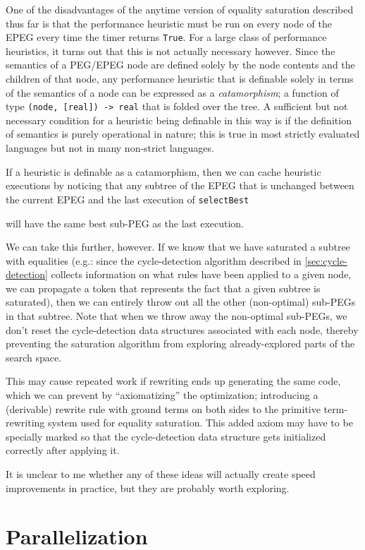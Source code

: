 \documentclass[11pt]{report}
\newcommand{\haskell}[1]{\texttt{#1}}
\newcommand{\sfixme}[0]{%
  \begin{minipage}[c]{3.5em}%
  \todo[color=green!40,inline]{\textsc{fixme}}%
  \end{minipage}}
\begin{document}
One of the disadvantages of the anytime version of equality saturation described
thus far is that the performance heuristic must be run on every node of the
EPEG every time the timer returns \haskell{True}. For a large class of
performance heuristics, it turns out that this is not actually necessary
however. Since the semantics of a PEG/EPEG node are defined solely by the node
contents and the children of that node, any performance heuristic that is
definable solely in terms of the semantics of a node can be expressed as a
\textit{catamorphism}; a function of type \haskell{(node, [real]) -> real} that
is folded over the tree. A sufficient but not necessary condition for a
heuristic being definable in this way is if the definition of semantics is
purely operational in nature; this is true in most strictly evaluated languages
but not in many non-strict languages.

If a heuristic is definable as a catamorphism, then we can cache heuristic
executions by noticing that any subtree of the EPEG that is unchanged between
the current EPEG and the last execution of \haskell{selectBest} \sfixme{}
will have the same best sub-PEG as the last execution.

We can take this further, however. If we know that we have saturated a subtree
with equalities (e.g.: since the cycle-detection algorithm described in
\autoref{sec:cycle-detection} collects information on what rules have been
applied to a given node, we can propagate a token that represents the fact that
a given subtree is saturated), then we can entirely throw out all the other
(non-optimal) sub-PEGs in that subtree. Note that when we throw away the
non-optimal sub-PEGs, we don't reset the cycle-detection data structures
associated with each node, thereby preventing the saturation algorithm from
exploring already-explored parts of the search space.

This may cause repeated work if rewriting ends up generating the same code,
which we can prevent by ``axiomatizing'' the optimization; introducing a
(derivable) rewrite rule with ground terms on both sides to the primitive
term-rewriting system used for equality saturation. This added axiom may have to
be specially marked so that the cycle-detection data structure gets initialized
correctly after applying it.

It is unclear to me whether any of these ideas will actually create speed
improvements in practice, but they are probably worth exploring.

\section{Parallelization}
\label{sec:parallelization}
\end{document}
